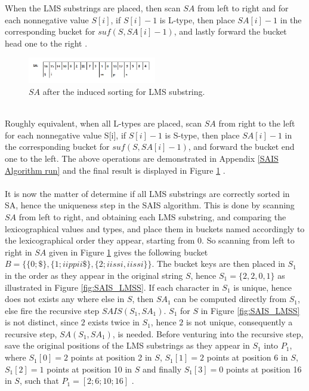 \documentclass[12pt]{article} %
\begin{document}
When the LMS substrings are placed, then scan $SA$ from left to right and for each nonnegative value $S[i]$, if $S[i]-1$ is L-type, then place $SA[i]-1$ in the corresponding bucket for $suf(S, SA[i]-1)$, and lastly forward the bucket head one to the right \cite{twoeffecient}. 
\begin{figure}[H]
    \centering
    \includegraphics[width=0.5\textwidth]{SAIS_LMSfinal}
    \captionsetup{width=0.8\textwidth}
    \caption{$SA$ after the induced sorting for LMS substring.}
    \label{fig:SAIS_LMSfinal}
    
\end{figure}
\\
Roughly equivalent, when all L-types are placed, scan $SA$ from right to the left for each nonnegative value S[i], if $S[i]-1$ is S-type, then place $SA[i]-1$ in the corresponding bucket for $suf(S, SA[i]-1)$, and forward the bucket end one to the left. The above operations are demonstrated in Appendix \ref{SAIS Algorithm run} and the final result is displayed in Figure \ref{fig:SAIS_LMSfinal} \cite{twoeffecient}.
\\ \\
It is now the matter of determine if all LMS substrings are correctly sorted in SA, hence the uniqueness step in the SAIS algorithm. This is done by scanning $SA$ from left to right, and obtaining each LMS substring, and comparing the lexicographical values and types, and place them in buckets named accordingly to the lexicographical order they appear, starting from 0. So scanning from left to right in $SA$ given in Figure \ref{fig:SAIS_LMSfinal} gives the following bucket $B = \{\{0; \$\}, \{1; iippii\$\}, \{2; iissi, iissi\}\}$. The bucket keys are then placed in $S_1$ in the order as they appear in the original string $S$, hence $S_1 = \{2,2,0,1\}$ as illustrated in Figure \ref{fig:SAIS_LMSS}. If each character in $S_1$ is unique, hence does not exists any where else in $S$, then $SA_1$ can be computed directly from $S_1$, else fire the recursive step $SAIS(S_1, SA_1)$. $S_1$ for $S$ in Figure \ref{fig:SAIS_LMSS} is not distinct, since $2$ exists twice in $S_1$, hence $2$ is not unique, consequently a recursive step, $SA(S_1, SA_1)$,  is needed. Before venturing into the recursive step, save the original positions of the LMS substrings as they appear in $S_1$ into $P_1$, where $S_{1}[0] = 2$ points at position 2 in $S$,  $S_{1}[1] = 2$ points at position 6 in $S$, $S_{1}[2] = 1$ points at position 10 in $S$ and finally $S_{1}[3] = 0$ points at position 16 in $S$, such that $P_1=[2; 6; 10; 16]$ \cite{twoeffecient}.
\end{document}
